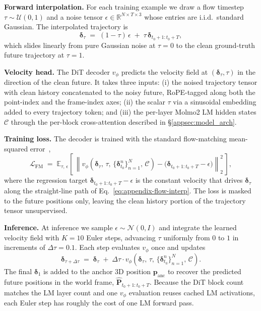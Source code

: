 \noindent\textbf{Forward interpolation.}
For each training example we draw a flow timestep $\tau \sim \mathcal{U}(0,1)$
and a noise tensor $\epsilon \in \mathbb{R}^{N \times T \times 3}$ whose
entries are i.i.d.\ standard Gaussian. The interpolated trajectory is
\begin{equation}
\boldsymbol{\delta}_{\tau}
\;=\;
(1-\tau)\,\epsilon
\;+\;
\tau\,\boldsymbol{\delta}_{t_0+1:t_0+T} ,
\label{eq:appendix-flow-interp}
\end{equation}
which slides linearly from pure Gaussian noise at $\tau=0$ to the clean
ground-truth future trajectory at $\tau=1$.

\noindent\textbf{Velocity head.}
The DiT decoder $v_\phi$ predicts the velocity field at $(\boldsymbol{\delta}_\tau, \tau)$
in the direction of the clean future. It takes three inputs:
(i) the noised trajectory tensor with clean history concatenated to the noisy
future, RoPE-tagged along both the point-index and the frame-index axes;
(ii) the scalar $\tau$ via a sinusoidal embedding added to every trajectory
token; and (iii) the per-layer Molmo2 LM hidden states $\mathcal{C}$
through the per-block cross-attention described in
\S\ref{appsec:model_arch}.

\noindent\textbf{Training loss.}
The decoder is trained with the standard
flow-matching mean-squared error~\cite{lipman2023flowmatching},
\begin{equation}
\mathcal{L}_{\mathrm{FM}}
\;=\;
\mathbb{E}_{\tau,\,\epsilon}
\!\left[\,
\left\|
v_{\phi}\!\left(
\boldsymbol{\delta}_{\tau},\,\tau,\,
\{\boldsymbol{\delta}_{t_0}^{n}\}_{n=1}^{N},\,
\mathcal{C}
\right)
-
\bigl(
\boldsymbol{\delta}_{t_0+1:t_0+T} - \epsilon
\bigr)
\right\|_2^2
\,\right] ,
\label{eq:appendix-flow-loss}
\end{equation}
where the regression target $\boldsymbol{\delta}_{t_0+1:t_0+T} - \epsilon$
is the constant velocity that drives $\boldsymbol{\delta}_\tau$ along the
straight-line path of Eq.~\eqref{eq:appendix-flow-interp}. The loss is
masked to the future positions only, leaving the clean history portion of
the trajectory tensor unsupervised.

\noindent\textbf{Inference.}
At inference we sample $\epsilon \sim \mathcal{N}(0, I)$ and integrate the
learned velocity field with $K=10$ Euler steps, advancing $\tau$ uniformly
from $0$ to $1$ in increments of $\Delta\tau = 0.1$. Each step evaluates
$v_\phi$ once and updates
\begin{equation}
\boldsymbol{\delta}_{\tau + \Delta\tau}
\;=\;
\boldsymbol{\delta}_{\tau}
\;+\;
\Delta\tau \cdot
v_{\phi}\!\left(
\boldsymbol{\delta}_{\tau},\,\tau,\,
\{\boldsymbol{\delta}_{t_0}^{n}\}_{n=1}^{N},\,
\mathcal{C}
\right) .
\label{eq:appendix-euler}
\end{equation}
The final $\boldsymbol{\delta}_1$ is added to the anchor 3D position
$\mathbf{p}_{\mathrm{anc}}$ to recover the predicted future positions in
the world frame, $\hat{\mathbf{P}}_{t_0+1:t_0+T}$. Because the DiT block
count matches the LM layer count and one $v_\phi$ evaluation reuses cached
LM activations, each Euler step has roughly the cost of one LM forward
pass.

